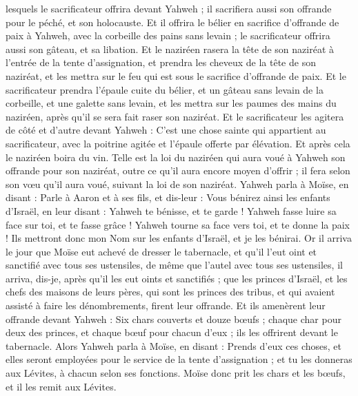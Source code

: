 \begin{multicols}{2}
lesquels le sacrificateur offrira devant Yahweh ; il sacrifiera aussi son offrande pour le péché, et son holocauste.
Et il offrira le bélier en sacrifice d'offrande de paix à Yahweh, avec la corbeille des pains sans levain ; le sacrificateur offrira aussi son gâteau, et sa libation.
Et le naziréen rasera la tête de son naziréat à l'entrée de la tente d'assignation, et prendra les cheveux de la tête de son naziréat, et les mettra sur le feu qui est sous le sacrifice d'offrande de paix.
Et le sacrificateur prendra l'épaule cuite du bélier, et un gâteau sans levain de la corbeille, et une galette sans levain, et les mettra sur les paumes des mains du naziréen, après qu'il se sera fait raser son naziréat.
Et le sacrificateur les agitera de côté et d'autre devant Yahweh : C'est une chose sainte qui appartient au sacrificateur, avec la poitrine agitée et l'épaule offerte par élévation. Et après cela le naziréen boira du vin.
Telle est la loi du naziréen qui aura voué à Yahweh son offrande pour son naziréat, outre ce qu'il aura encore moyen d'offrir ; il fera selon son vœu qu'il aura voué, suivant la loi de son naziréat.
Yahweh parla à Moïse, en disant :
Parle à Aaron et à ses fils, et dis-leur : Vous bénirez ainsi les enfants d'Israël, en leur disant :
Yahweh te bénisse, et te garde !
Yahweh fasse luire sa face sur toi, et te fasse grâce !
Yahweh tourne sa face vers toi, et te donne la paix !
Ils mettront donc mon Nom sur les enfants d'Israël, et je les bénirai.
\VerseOne{}Or il arriva le jour que Moïse eut achevé de dresser le tabernacle, et qu'il l'eut oint et sanctifié avec tous ses ustensiles, de même que l'autel avec tous ses ustensiles, il arriva, dis-je, après qu'il les eut oints et sanctifiés ;
que les princes d'Israël, et les chefs des maisons de leurs pères, qui sont les princes des tribus, et qui avaient assisté à faire les dénombrements, firent leur offrande.
Et ils amenèrent leur offrande devant Yahweh : Six chars couverts et douze bœufs ; chaque char pour deux des princes, et chaque bœuf pour chacun d'eux ; ils les offrirent devant le tabernacle.
Alors Yahweh parla à Moïse, en disant :
Prends d'eux ces choses, et elles seront employées pour le service de la tente d'assignation ; et tu les donneras aux Lévites, à chacun selon ses fonctions.
Moïse donc prit les chars et les bœufs, et il les remit aux Lévites.

\end{multicols}
